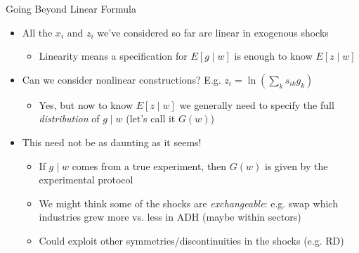 \documentclass[11pt,english]{beamer}
\begin{document}
\begin{frame}{Going Beyond Linear Formula}
\begin{itemize}
\item All the $x_i$ and $z_i$ we've considered so far are linear in exogenous shocks\smallskip
\begin{itemize}
\item Linearity means a specification for $E[g\mid w]$ is enough to know $E[z\mid w]$
\end{itemize}\bigskip\pause{}
\item Can we consider nonlinear constructions? E.g. $z_i=\ln (\sum_k s_{ik}g_k)$ \smallskip
\begin{itemize}
\item Yes, but now to know $E[z\mid w]$ we generally need to specify the full \emph{distribution} of $g\mid w$ (let's call it $G(w)$)
\end{itemize}\bigskip\pause{}
\item This need not be as daunting as it seems! \smallskip\pause{}
\begin{itemize}
\item If $g\mid w$ comes from a true experiment, then $G(w)$ is given by the experimental protocol\smallskip\pause{}
\item We might think some of the shocks are \emph{exchangeable}: e.g. swap which industries grew more vs. less in ADH (maybe within sectors)\smallskip\pause{}
\item Could exploit other symmetries/discontinuities in the shocks (e.g. RD)
\end{itemize}
\end{itemize}
\end{frame}
\end{document}
